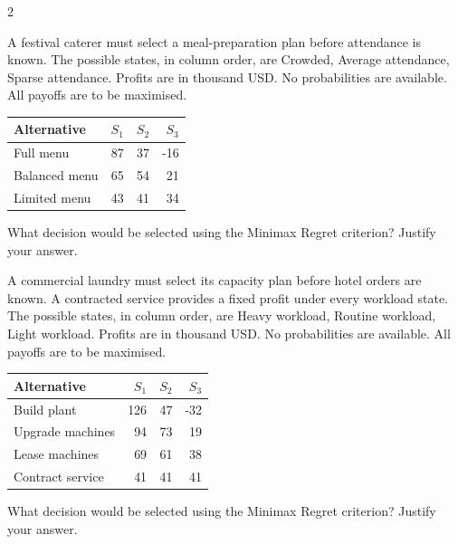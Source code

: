 \begin{multicols}{2}
\begin{minipage}{\linewidth}
A festival caterer must select a meal-preparation plan before attendance is known. The possible states, in column order, are Crowded, Average attendance, Sparse attendance. Profits are in thousand USD. No probabilities are available. All payoffs are to be maximised.
\begin{center}\small\setlength{\tabcolsep}{4pt}
\begin{tabular}{@{}lrrr@{}}\toprule
Alternative&$S_1$&$S_2$&$S_3$\\\midrule
Full menu&87&37&-16\\
Balanced menu&65&54&21\\
Limited menu&43&41&34\\\bottomrule
\end{tabular}\end{center}

What decision would be selected using the Minimax Regret criterion? Justify your answer. 
\end{minipage}\par

\begin{minipage}{\linewidth}
A commercial laundry must select its capacity plan before hotel orders are known. A contracted service provides a fixed profit under every workload state. The possible states, in column order, are Heavy workload, Routine workload, Light workload. Profits are in thousand USD. No probabilities are available. All payoffs are to be maximised.
\begin{center}\small\setlength{\tabcolsep}{4pt}
\begin{tabular}{@{}lrrr@{}}\toprule
Alternative&$S_1$&$S_2$&$S_3$\\\midrule
Build plant&126&47&-32\\
Upgrade machines&94&73&19\\
Lease machines&69&61&38\\
Contract service&41&41&41\\\bottomrule
\end{tabular}\end{center}

What decision would be selected using the Minimax Regret criterion? Justify your answer. 
\end{minipage}\par


\end{multicols}
